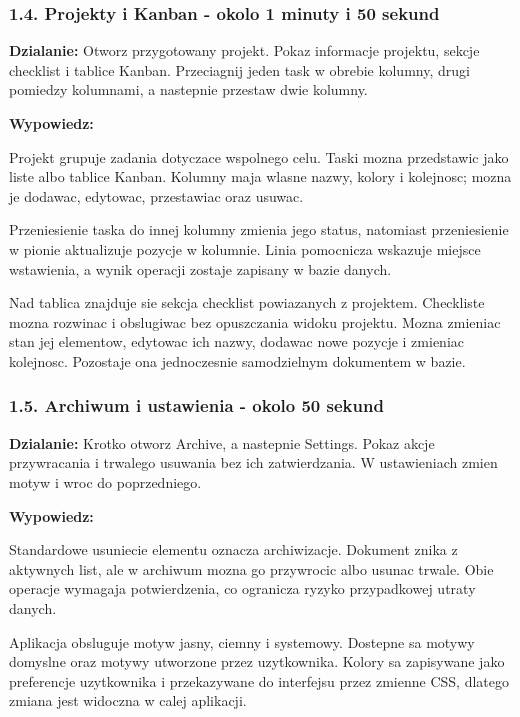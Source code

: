 \documentclass[
  polish,
  12pt,
  a4paper,
]{article}
\renewenvironment{quote}
  {\list{}{\leftmargin=1.2em\rightmargin=0.6em}%
   \item\relax\color{black}\setlength{\parskip}{0.7em}}
  {\endlist}
\begin{document}
\subsubsection{1.4. Projekty i Kanban - okolo 1 minuty i 50
sekund}\label{14-projekty-i-kanban---okolo-1-minuty-i-50-sekund}

\textbf{Dzialanie:} Otworz przygotowany projekt. Pokaz informacje
projektu, sekcje checklist i tablice Kanban. Przeciagnij jeden task w
obrebie kolumny, drugi pomiedzy kolumnami, a nastepnie przestaw dwie
kolumny.

\textbf{Wypowiedz:}

\begin{quote}
Projekt grupuje zadania dotyczace wspolnego celu. Taski mozna
przedstawic jako liste albo tablice Kanban. Kolumny maja wlasne nazwy,
kolory i kolejnosc; mozna je dodawac, edytowac, przestawiac oraz usuwac.

Przeniesienie taska do innej kolumny zmienia jego status, natomiast
przeniesienie w pionie aktualizuje pozycje w kolumnie. Linia pomocnicza
wskazuje miejsce wstawienia, a wynik operacji zostaje zapisany w bazie
danych.

Nad tablica znajduje sie sekcja checklist powiazanych z projektem.
Checkliste mozna rozwinac i obslugiwac bez opuszczania widoku projektu.
Mozna zmieniac stan jej elementow, edytowac ich nazwy, dodawac nowe
pozycje i zmieniac kolejnosc. Pozostaje ona jednoczesnie samodzielnym
dokumentem w bazie.
\end{quote}

\subsubsection{1.5. Archiwum i ustawienia - okolo 50
sekund}\label{15-archiwum-i-ustawienia---okolo-50-sekund}

\textbf{Dzialanie:} Krotko otworz Archive, a nastepnie Settings. Pokaz
akcje przywracania i trwalego usuwania bez ich zatwierdzania. W
ustawieniach zmien motyw i wroc do poprzedniego.

\textbf{Wypowiedz:}

\begin{quote}
Standardowe usuniecie elementu oznacza archiwizacje. Dokument znika z
aktywnych list, ale w archiwum mozna go przywrocic albo usunac trwale.
Obie operacje wymagaja potwierdzenia, co ogranicza ryzyko przypadkowej
utraty danych.

Aplikacja obsluguje motyw jasny, ciemny i systemowy. Dostepne sa motywy
domyslne oraz motywy utworzone przez uzytkownika. Kolory sa zapisywane
jako preferencje uzytkownika i przekazywane do interfejsu przez zmienne
CSS, dlatego zmiana jest widoczna w calej aplikacji.
\end{quote}
\end{document}
